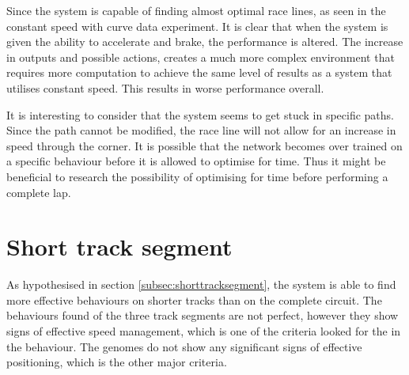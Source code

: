 Since the system is capable of finding almost optimal race lines, as seen in the constant speed with curve data experiment. It is clear that when the system is given the ability to accelerate and brake, the performance is altered. The increase in outputs and possible actions, creates a much more complex environment that requires more computation to achieve the same level of results as a system that utilises constant speed. This results in worse performance overall.

It is interesting to consider that the system seems to get stuck in specific paths. Since the path cannot be modified, the race line will not allow for an increase in speed through the corner. It is possible that the network becomes over trained on a specific behaviour before it is allowed to optimise for time. Thus it might be beneficial to research the possibility of optimising for time before performing a complete lap. 



\section{Short track segment}
\label{result:short}
As hypothesised in section \ref{subsec:shorttracksegment}, the system is able to find more effective behaviours on shorter tracks than on the complete circuit. The behaviours found of the three track segments are not perfect, however they show signs of effective speed management, which is one of the criteria looked for the in the behaviour. The genomes do not show any significant signs of effective positioning, which is the other major criteria. 

